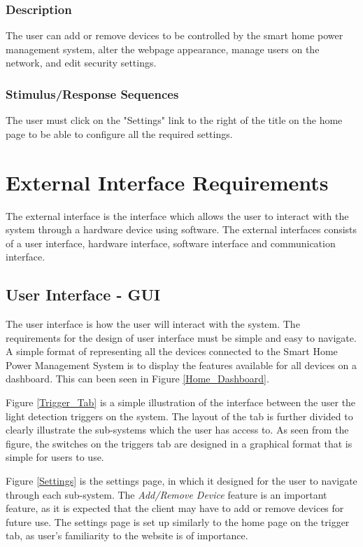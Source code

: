 \documentclass[11pt, a4paper]{article}
\begin{document}
	\subsubsection{Description}
	The user can add or remove devices to be controlled by the smart home power management system, alter the webpage appearance, manage users on the network, and edit security settings. 
	\subsubsection{Stimulus/Response Sequences}
	The user must click on the "Settings" link to the right of the title on the home page to be able to configure all the required settings.
	
	\section{External Interface Requirements}
	The external interface is the interface which allows the user to interact with the system through a hardware device using software. The external interfaces consists of a user interface, hardware interface, software interface and communication interface. 
	
	\subsection{User Interface - GUI}
	The user interface is how the user will interact with the system. The requirements for the design of user interface must be simple and easy to navigate. A simple format of representing all the devices connected to the Smart Home Power Management System is to display the features available for all devices on a dashboard. This can been seen in Figure \ref{Home_Dashboard}.
	
	\noindent
	Figure \ref{Trigger_Tab} is a simple illustration of the interface between the user the light detection triggers on the system. The layout of the tab is further divided to clearly illustrate the sub-systems which the user has access to. As seen from the figure, the switches on the triggers tab are designed in a graphical format that is simple for users to use.  
	
	\noindent
	Figure \ref{Settings} is the settings page, in which it designed for the user to navigate through each sub-system. The \textit{Add/Remove Device} feature is an important feature, as it is expected that the client may have to add or remove devices for future use. The settings page is set up similarly to the home page on the trigger tab, as user's  familiarity to the website is of importance.
	
\end{document}
